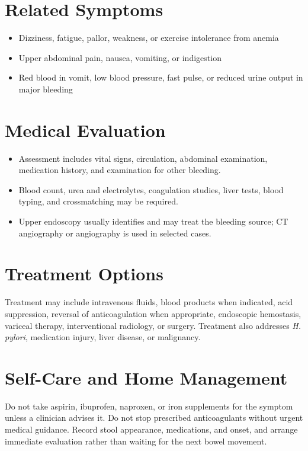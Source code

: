 \section*{Related Symptoms}
\begin{itemize}
  \item Dizziness, fatigue, pallor, weakness, or exercise intolerance from anemia
  \item Upper abdominal pain, nausea, vomiting, or indigestion
  \item Red blood in vomit, low blood pressure, fast pulse, or reduced urine output in major bleeding
\end{itemize}

\section*{Medical Evaluation}
\begin{itemize}
  \item Assessment includes vital signs, circulation, abdominal examination, medication history, and examination for other bleeding.
  \item Blood count, urea and electrolytes, coagulation studies, liver tests, blood typing, and crossmatching may be required.
  \item Upper endoscopy usually identifies and may treat the bleeding source; CT angiography or angiography is used in selected cases.
\end{itemize}

\section*{Treatment Options}
Treatment may include intravenous fluids, blood products when indicated, acid suppression, reversal of anticoagulation when appropriate, endoscopic hemostasis, variceal therapy, interventional radiology, or surgery. Treatment also addresses \textit{H. pylori}, medication injury, liver disease, or malignancy.

\section*{Self-Care and Home Management}
Do not take aspirin, ibuprofen, naproxen, or iron supplements for the symptom unless a clinician advises it. Do not stop prescribed anticoagulants without urgent medical guidance. Record stool appearance, medications, and onset, and arrange immediate evaluation rather than waiting for the next bowel movement.

